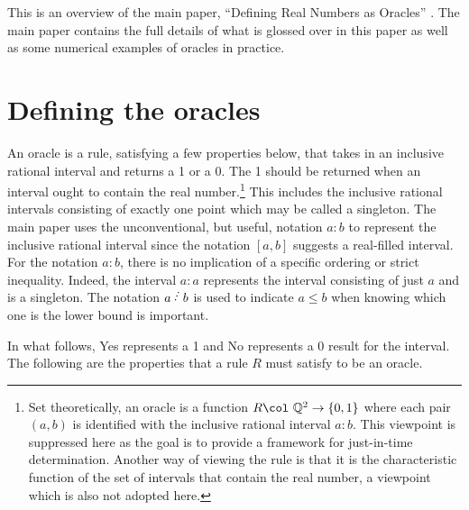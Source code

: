 \documentclass[12pt]{article}
\begin{document}
This is an overview of the main paper, ``Defining Real Numbers as Oracles'' \cite{taylor23main}. The main paper contains the full details of what is glossed over in this paper as well as some numerical examples of oracles in practice. 

\section{Defining the oracles}\label{sec:ora}

An oracle is a rule, satisfying a few properties below, that takes in an inclusive rational interval and returns a 1 or a 0. The 1 should be returned when an interval ought to contain the real number.\footnote{Set theoretically, an oracle is a function $R \col \ \mathbb{Q}^2 \to \{0,1\}$ where each pair $(a,b)$ is identified with the inclusive rational interval $a:b$. This viewpoint is suppressed here as the goal is to provide a framework for just-in-time determination. Another way of viewing the rule is that it is the characteristic function of the set of intervals that contain the real number, a viewpoint which is also not adopted here.} This includes the inclusive rational intervals consisting of exactly one point which may be called a singleton. The main paper uses the unconventional, but useful, notation $a:b$ to represent the inclusive rational interval since the notation $[a,b]$ suggests a real-filled interval. For the notation $a:b$, there is no implication of a specific ordering or strict inequality.  Indeed, the  interval $a:a$ represents the interval consisting of just $a$ and is a singleton. The notation $a\lte b$ is used to indicate $a\leq b$ when knowing which one is the lower bound is important. 

In what follows, Yes represents a 1 and No represents a 0 result for the interval. The following are the properties that a rule $R$ must satisfy to be an oracle. 
\end{document}
